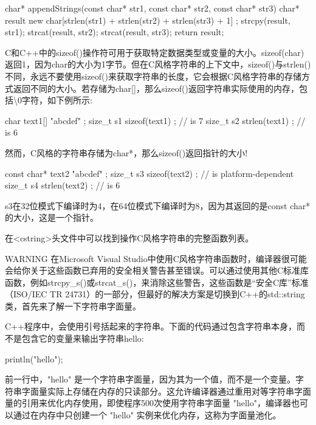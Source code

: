 \begin{cpp}
char* appendStrings(const char* str1, const char* str2, const char* str3)
{
    char* result { new char[strlen(str1) + strlen(str2) + strlen(str3) + 1] };
    strcpy(result, str1);
    strcat(result, str2);
    strcat(result, str3);
    return result;
}
\end{cpp}

C和C++中的sizeof()操作符可用于获取特定数据类型或变量的大小。sizeof(char)返回1，因为char的大小为1字节。但在C风格字符串的上下文中，sizeof()与strlen()不同，永远不要使用sizeof()来获取字符串的长度，它会根据C风格字符串的存储方式返回不同的大小。若存储为char[]，那么sizeof()返回字符串实际使用的内存，包括\textbackslash{}0字符，如下例所示:

\begin{cpp}
char text1[] { "abcdef" };
size_t s1 { sizeof(text1) }; // is 7
size_t s2 { strlen(text1) }; // is 6
\end{cpp}

然而，C风格的字符串存储为char*，那么sizeof()返回指针的大小!

\begin{cpp}
const char* text2 { "abcdef" };
size_t s3 { sizeof(text2) }; // is platform-dependent
size_t s4 { strlen(text2) }; // is 6
\end{cpp}

s3在32位模式下编译时为4，在64位模式下编译时为8，因为其返回的是const char*的大小，这是一个指针。

在<cstring>头文件中可以找到操作C风格字符串的完整函数列表。

\begin{myWarning}{WARNING}
在Microsoft Visual Studio中使用C风格字符串函数时，编译器很可能会给你关于这些函数已弃用的安全相关警告甚至错误。可以通过使用其他C标准库函数，例如strcpy\_s()或strcat\_s()，来消除这些警告，这些函数是“安全C库”标准（ISO/IEC TR 24731）的一部分，但最好的解决方案是切换到C++的std::string类，首先来了解一下字符串字面量。
\end{myWarning}


C++程序中，会使用引号括起来的字符串。下面的代码通过包含字符串本身，而不是包含它的变量来输出字符串hello:

\begin{cpp}
println("hello");
\end{cpp}

前一行中，"hello" 是一个字符串字面量，因为其为一个值，而不是一个变量。字符串字面量实际上存储在内存的只读部分。这允许编译器通过重用对等字符串字面量的引用来优化内存使用，即使程序500次使用字符串字面量 "hello"，编译器也可以通过在内存中只创建一个 "hello" 实例来优化内存，这称为字面量池化。

